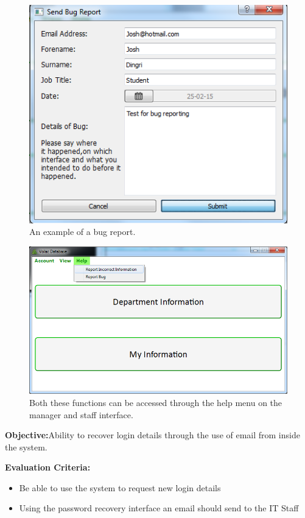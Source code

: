 \begin{figure}[H]
    \includegraphics[width=\textwidth]{./Testing/Images/SubmitBugTest.png}
    \caption{An example of a bug report.} 
\end{figure}

\begin{figure}[H]
    \includegraphics[width=\textwidth]{./Testing/Images/HelpMenu.png}
    \caption{Both these functions can be accessed through the help menu on the manager and staff interface.} 
\end{figure}

\textbf{Objective:}Ability to recover login details through the use of email from inside the system.

\textbf{Evaluation Criteria:}
\begin{itemize}
\item{Be able to use the system to request new login details}
\item{Using the password recovery interface an email should send to the IT Staff}
\end{itemize}

